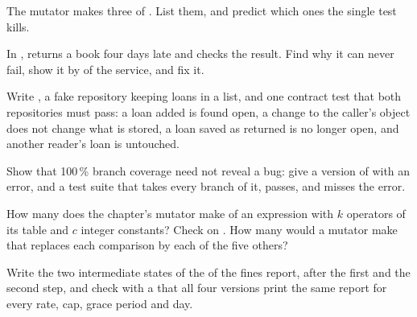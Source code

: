 \begin{exercise}[$\star$]\label{exo:b3:software-engineering:4}
The mutator makes three  of . List them, and predict which ones the single test  kills.
\end{exercise}

\begin{exercise}[$\star\star$]\label{exo:b3:software-engineering:5}
In ,  returns a book four days late and checks the result. Find why it can never fail, show it by  of the service, and fix it.
\end{exercise}

\begin{exercise}[$\star\star$]\label{exo:b3:software-engineering:6}
Write , a fake repository keeping loans in a list, and one contract test that both repositories must pass: a loan added is found open, a change to the caller's object does not change what is stored, a loan saved as returned is no longer open, and another reader's loan is untouched.
\end{exercise}

\begin{exercise}[$\star\star$]\label{exo:b3:software-engineering:7}
Show that 100\,\% branch coverage need not reveal a bug: give a version of  with an error, and a test suite that takes every branch of it, passes, and misses the error.
\end{exercise}

\begin{exercise}[$\star\star$]\label{exo:b3:software-engineering:8}
How many  does the chapter's mutator make of an expression with $k$ operators of its table and $c$ integer constants? Check on . How many would a mutator make that replaces each comparison by each of the five others?
\end{exercise}

\begin{exercise}[$\star\star$]\label{exo:b3:software-engineering:9}
Write the two intermediate states of the  of the fines report, after the first and the second step, and check with a  that all four versions print the same report for every rate, cap, grace period and day.
\end{exercise}

